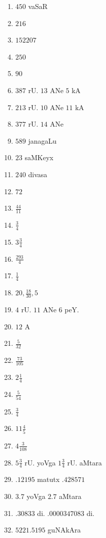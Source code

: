 
\begin{multicols}{2}
\begin{enumerate}[$(1)$]
\item $450$ vaSaR
\item $216$ 
\item $152207$
\item $250$
\item $90$
\item $387$ rU. $13$ ANe $5$ kA
\item $213$ rU. $10$ ANe $11$ kA
\item $377$ rU. $14$ ANe
\item $589$ janagaLu
\item $23$ saMKeyx
\item $240$ divasa
\item $72$
\item $\frac{44}{11}$
\item $\frac{3}{4}$
\item $3 \frac{3}{4}$
\item $\frac{293}{4}$
\item $\frac{1}{4}$
\item $20, \frac{18}{30}, 5$
\item $4$ rU. $11$ ANe $6$ peY.
\item $12$ A 
\item $\frac{5}{32}$ 
\item $\frac{73}{105}$
\item $2\frac{1}{4}$
\item $\frac{5}{54}$
\item $\frac{3}{4}$
\item $11\frac{4}{5}$
\item $4\frac{3}{108}$
\item $5 \frac{3}{4}$ rU. yoVga $1\frac{3}{4}$ rU. aMtara
\item $.12195$ matutx $.428571$
\item $3.7$ yoVga $2.7$ aMtara
\item $.30833$ di. $.0000347083$ di.
\item $5221.5195$ guNAkAra 


\end{enumerate}
\end{multicols}
